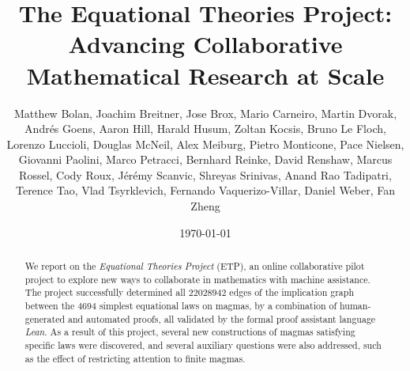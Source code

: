 \documentclass[12pt]{amsart}
\title[Equational Theories Project]{The Equational Theories Project: Advancing Collaborative Mathematical Research at Scale}
\author[Equational Theories Project contributors]{Matthew Bolan, Joachim Breitner, Jose Brox, Mario Carneiro,
  Martin Dvorak, Andr\'es Goens, Aaron Hill, Harald Husum, Zoltan Kocsis, Bruno Le Floch, Lorenzo Luccioli, Douglas McNeil,
  Alex Meiburg, Pietro Monticone, Pace Nielsen, Giovanni Paolini, Marco Petracci, Bernhard Reinke, David Renshaw, Marcus Rossel, Cody Roux,
  J\'er\'emy Scanvic, Shreyas Srinivas, Anand Rao Tadipatri, Terence Tao, Vlad Tsyrklevich, Fernando Vaquerizo-Villar,
  Daniel Weber, Fan Zheng}
\date{\today}
\theoremstyle{definition}
\begin{document}
\begin{abstract}
  We report on the \emph{Equational Theories Project} (ETP), an online collaborative pilot project
  to explore new ways to collaborate in mathematics with machine assistance. The project successfully determined all $\num{22028942}$ edges of the implication graph between the $4694$ simplest equational laws on magmas, by a combination of
  human-generated and automated proofs, all validated by the formal proof assistant language
  \emph{Lean}. As a result of this project, several new constructions of magmas satisfying specific laws were discovered, and several auxiliary questions were also addressed, such as the effect of restricting attention to finite magmas.
\end{abstract}

\maketitle

{
\setlength{\parskip}{0em}
\tableofcontents
}








% 







\appendix







\listoftodos{}
\end{document}
